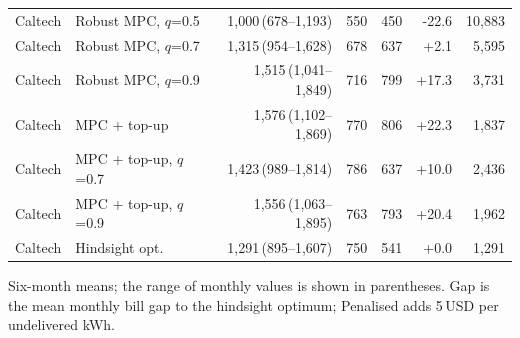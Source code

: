 \begin{table}[!htbp]
\begin{tabular*}{\textwidth}{@{\extracolsep{\fill}}llrrrrr@{}}
Caltech & Robust MPC, $q$=0.5 & 1,000\,{\scriptsize(678--1,193)} & 550 & 450 & -22.6 & 10,883 \\
Caltech & Robust MPC, $q$=0.7 & 1,315\,{\scriptsize(954--1,628)} & 678 & 637 & +2.1 & 5,595 \\
Caltech & Robust MPC, $q$=0.9 & 1,515\,{\scriptsize(1,041--1,849)} & 716 & 799 & +17.3 & 3,731 \\
Caltech & MPC + top-up & 1,576\,{\scriptsize(1,102--1,869)} & 770 & 806 & +22.3 & 1,837 \\
Caltech & MPC + top-up, $q$=0.7 & 1,423\,{\scriptsize(989--1,814)} & 786 & 637 & +10.0 & 2,436 \\
Caltech & MPC + top-up, $q$=0.9 & 1,556\,{\scriptsize(1,063--1,895)} & 763 & 793 & +20.4 & 1,962 \\
Caltech & Hindsight opt. & 1,291\,{\scriptsize(895--1,607)} & 750 & 541 & +0.0 & 1,291 \\
\hline
\end{tabular*}
\par\smallskip\parbox{\textwidth}{\scriptsize Six-month means; the range of monthly values is shown in parentheses. Gap is the mean monthly bill gap to the hindsight optimum; Penalised adds 5\,USD per undelivered kWh.}
\end{table}
